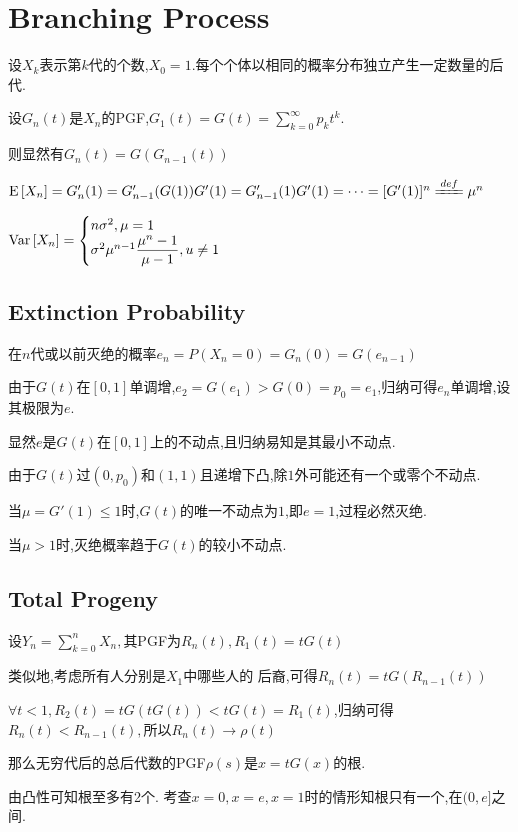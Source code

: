 \section{Branching Process}
设$ X_k$表示第$ k$代的个数,$ X_0=1.$每个个体以相同的概率分布独立产生一定数量的后代.

设$ G_n(t)$是$ X_n$的PGF,$ G_1(t) = G(t) = \sum_{k=0}^\infty{p_k}t^k$.

则显然有$ G_n(t) = G(G_{n-1}(t))$

$ \E{X_n} = G'_n(1) = G'_{n-1}(G(1))G'(1) = G'_{n-1}(1)G'(1) = \cdots =[G'(1)]^n \xlongequal{def}\mu^n$

$ \text{Var}\left[X_n\right] = \begin{cases} n\sigma^2 , \mu=1 \\ \sigma^2\mu^{n-1}\dfrac{\mu^n-1}{\mu-1}, u\neq 1\end{cases}$

\subsection{Extinction Probability}
在$ n$代或以前灭绝的概率$ e_n = P(X_n = 0) = G_n(0) = G(e_{n-1})$

由于$ G(t)$在$ [0,1]$单调增,$ e_2 = G(e_1) > G(0) = p_0 = e_1$,归纳可得$ e_n$单调增,设其极限为$ e$.

显然$ e$是$ G(t)$在$ [0,1]$上的不动点,且归纳易知是其最小不动点.

由于$ G(t)$过$ (0,p_0)$和$ (1,1)$且递增下凸,除$ 1$外可能还有一个或零个不动点.

当$ \mu = G'(1) \le 1$时,$ G(t)$的唯一不动点为$ 1$,即$ e = 1$,过程必然灭绝.

当$ \mu >1$时,灭绝概率趋于$ G(t)$的较小不动点.

\subsection{Total Progeny}
设$ Y_n = \sum_{k=0}^n{X_n},$其PGF为$ R_n(t), R_1(t) = tG(t)$

类似地,考虑所有人分别是$ X_1$中哪些人的 后裔,可得$ R_n(t) = tG(R_{n-1}(t))$

$ \forall t < 1, R_2(t) = tG(tG(t)) < tG(t) = R_1(t)$,归纳可得$ R_n(t)< R_{n-1}(t),$所以$ R_n(t)\to \rho(t)$

那么无穷代后的总后代数的PGF$ \rho(s)$是$ x = tG(x) $的根.

由凸性可知根至多有2个. 考查$ x=0, x=e, x=1$时的情形知根只有一个,在$ (0,e]$之间.


